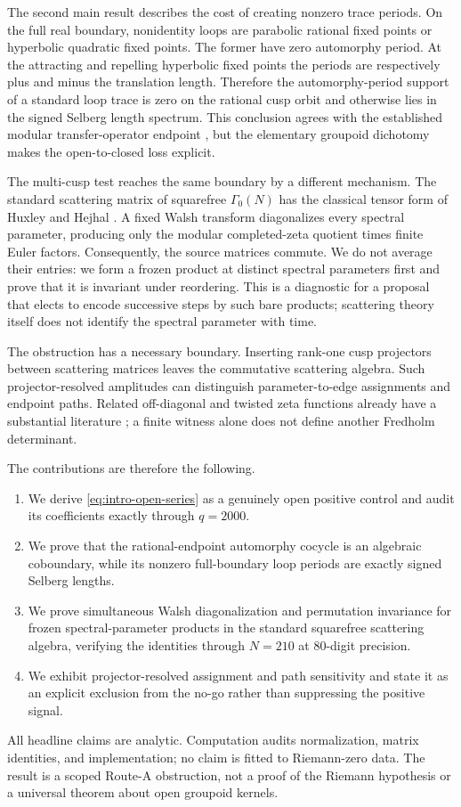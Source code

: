 The second main result describes the cost of creating nonzero trace periods.
On the full real boundary, nonidentity loops are parabolic rational fixed
points or hyperbolic quadratic fixed points.  The former have zero automorphy
period.  At the attracting and repelling hyperbolic fixed points the periods
are respectively plus and minus the translation length.  Therefore the
automorphy-period support of a standard loop trace is zero on the rational
cusp orbit and otherwise lies in the signed Selberg length spectrum.  This
conclusion agrees with the established
modular transfer-operator endpoint \cite{Mayer1991,PohlWabnitz2026}, but the
elementary groupoid dichotomy makes the open-to-closed loss explicit.

The multi-cusp test reaches the same boundary by a different mechanism.  The
standard scattering matrix of squarefree \(\Gamma_0(N)\) has the classical
tensor form of Huxley and Hejhal \cite{Huxley1984,CakoniChanillo2019,
LevitinStrohmaier2021}.  A fixed Walsh transform diagonalizes every spectral
parameter, producing only the modular completed-zeta quotient times finite
Euler factors.  Consequently, the source matrices commute.  We do not average
their entries: we form a frozen product at distinct spectral parameters first
and prove that it is invariant under reordering.  This is a diagnostic for a
proposal that elects to encode successive steps by such bare products;
scattering theory itself does not identify the spectral parameter with time.

The obstruction has a necessary boundary.  Inserting rank-one cusp projectors
between scattering matrices leaves the commutative scattering algebra.  Such
projector-resolved amplitudes can distinguish parameter-to-edge assignments
and endpoint paths.  Related
off-diagonal and twisted zeta functions already have a substantial literature
\cite{Kiral2016,DiamantisFriedbergStromberg2026}; a finite witness alone does
not define another Fredholm determinant.

The contributions are therefore the following.

\begin{enumerate}
\item We derive \cref{eq:intro-open-series} as a genuinely open positive
control and audit its coefficients exactly through \(q=2000\).
\item We prove that the rational-endpoint automorphy cocycle is an algebraic
coboundary,
while its nonzero full-boundary loop periods are exactly signed Selberg
lengths.
\item We prove simultaneous Walsh diagonalization and permutation invariance
for frozen spectral-parameter products in the standard squarefree scattering
algebra, verifying the identities through \(N=210\) at 80-digit precision.
\item We exhibit projector-resolved assignment and path sensitivity and state
it as an explicit exclusion from the no-go rather than suppressing the
positive signal.
\end{enumerate}

All headline claims are analytic.  Computation audits normalization, matrix
identities, and implementation; no claim is fitted to Riemann-zero data.  The
result is a scoped Route-A obstruction, not a proof of the Riemann hypothesis
or a universal theorem about open groupoid kernels.
